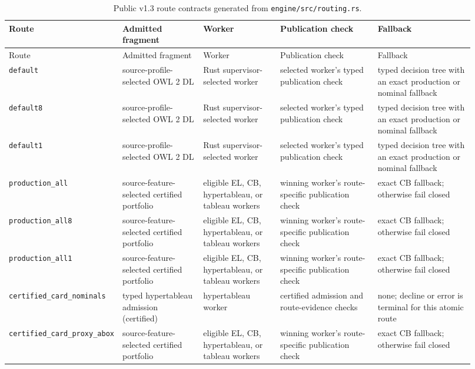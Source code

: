 \begingroup\footnotesize
\begin{longtable}{@{}p{0.13\linewidth}p{0.18\linewidth}p{0.17\linewidth}p{0.22\linewidth}p{0.22\linewidth}@{}}
\caption{Public v1.3 route contracts generated from \texttt{engine/src/routing.rs}.}\label{tab:route-contracts}\\
\toprule
Route & Admitted fragment & Worker & Publication check & Fallback \\
\midrule
\endfirsthead
\toprule Route & Admitted fragment & Worker & Publication check & Fallback \\
\midrule
\endhead
\texttt{default} & source-profile-selected OWL 2 DL & Rust supervisor-selected worker & selected worker's typed publication check & typed decision tree with an exact production or nominal fallback \\
\texttt{default8} & source-profile-selected OWL 2 DL & Rust supervisor-selected worker & selected worker's typed publication check & typed decision tree with an exact production or nominal fallback \\
\texttt{default1} & source-profile-selected OWL 2 DL & Rust supervisor-selected worker & selected worker's typed publication check & typed decision tree with an exact production or nominal fallback \\
\texttt{production\_all} & source-feature-selected certified portfolio & eligible EL, CB, hypertableau, or tableau workers & winning worker's route-specific publication check & exact CB fallback; otherwise fail closed \\
\texttt{production\_all8} & source-feature-selected certified portfolio & eligible EL, CB, hypertableau, or tableau workers & winning worker's route-specific publication check & exact CB fallback; otherwise fail closed \\
\texttt{production\_all1} & source-feature-selected certified portfolio & eligible EL, CB, hypertableau, or tableau workers & winning worker's route-specific publication check & exact CB fallback; otherwise fail closed \\
\texttt{certified\_card\_nominals} & typed hypertableau admission (certified) & hypertableau worker & certified admission and route-evidence checks & none; decline or error is terminal for this atomic route \\
\texttt{certified\_card\_proxy\_abox} & source-feature-selected certified portfolio & eligible EL, CB, hypertableau, or tableau workers & winning worker's route-specific publication check & exact CB fallback; otherwise fail closed \\

\end{longtable}
